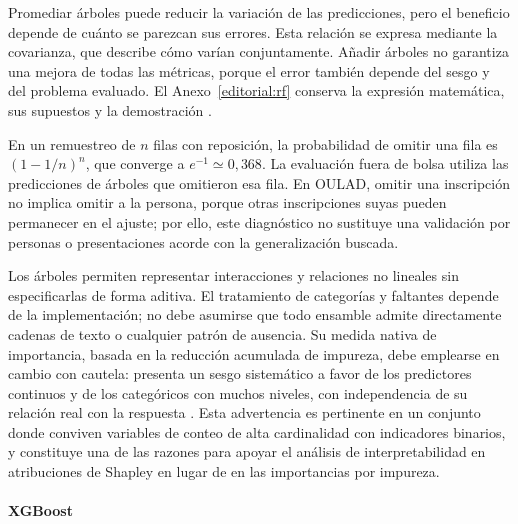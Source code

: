 Promediar árboles puede reducir la variación de las predicciones, pero el beneficio depende de cuánto se parezcan sus errores. Esta relación se expresa mediante la covarianza, que describe cómo varían conjuntamente. Añadir árboles no garantiza una mejora de todas las métricas, porque el error también depende del sesgo y del problema evaluado. El Anexo~\ref{editorial:rf} conserva la expresión matemática, sus supuestos y la demostración \cite{breiman2001}.



En un remuestreo de $n$ filas con reposición, la probabilidad de omitir una fila es $(1-1/n)^n$, que converge a $e^{-1}\simeq0{,}368$. La evaluación fuera de bolsa utiliza las predicciones de árboles que omitieron esa fila. En OULAD, omitir una inscripción no implica omitir a la persona, porque otras inscripciones suyas pueden permanecer en el ajuste; por ello, este diagnóstico no sustituye una validación por personas o presentaciones acorde con la generalización buscada.

Los árboles permiten representar interacciones y relaciones no lineales sin especificarlas de forma aditiva. El tratamiento de categorías y faltantes depende de la implementación; no debe asumirse que todo ensamble admite directamente cadenas de texto o cualquier patrón de ausencia. Su medida nativa de importancia, basada en la reducción acumulada de impureza, debe emplearse en cambio con cautela: presenta un sesgo sistemático a favor de los predictores continuos y de los categóricos con muchos niveles, con independencia de su relación real con la respuesta \cite{strobl2007}. Esta advertencia es pertinente en un conjunto donde conviven variables de conteo de alta cardinalidad con indicadores binarios, y constituye una de las razones para apoyar el análisis de interpretabilidad en atribuciones de Shapley en lugar de en las importancias por impureza.

\paragraph{XGBoost}

